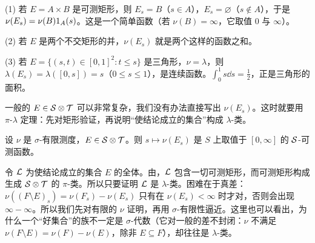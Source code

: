 \begin{example}[截口测度是什么样的函数]\label{ex:product:section-function}
(1) 若 $E=A\times B$ 是可测矩形，则 $E_s=B$（$s\in A$），$E_s=\varnothing$（$s\notin A$），于是 $\nu(E_s)=\nu(B)1_A(s)$。这是一个简单函数（若 $\nu(B)=\infty$，它取值 $0$ 与 $\infty$）。

(2) 若 $E$ 是两个不交矩形的并，$\nu(E_s)$ 就是两个这样的函数之和。

(3) 若 $E=\{(s,t)\in[0,1]^2:t\leqslant s\}$ 是三角形，$\nu=\lambda$，则 $\lambda(E_s)=\lambda([0,s])=s$（$0\leqslant s\leqslant1$），是连续函数。$\int_0^1s\dd s=\frac12$，正是三角形的面积。

一般的 $E\in\mathcal{S}\otimes\mathcal{T}$ 可以非常复杂，我们没有办法直接写出 $\nu(E_s)$。这时就要用 $\pi$-$\lambda$ 定理：先对矩形验证，再说明“使结论成立的集合”构成 $\lambda$-类。
\end{example}

\begin{lemma}\label{lem:product:section-measurable}
设 $\nu$ 是 $\sigma$-有限测度，$E\in\mathcal{S}\otimes\mathcal{T}$。则 $s\mapsto\nu(E_s)$ 是 $S$ 上取值于 $[0,\infty]$ 的 $\mathcal{S}$-可测函数。
\end{lemma}

\begin{remark}[证明思路]
令 $\mathcal{L}$ 为使结论成立的集合 $E$ 的全体。由，$\mathcal{L}$ 包含一切可测矩形，而可测矩形构成生成 $\mathcal{S}\otimes\mathcal{T}$ 的 $\pi$-类。所以只要证明 $\mathcal{L}$ 是 $\lambda$-类。困难在于真差：$\nu((F\setminus E)_s)=\nu(F_s)-\nu(E_s)$ 只有在 $\nu(E_s)<\infty$ 时才对，否则会出现 $\infty-\infty$。所以我们先对有限的 $\nu$ 证明，再用 $\sigma$-有限性逼近。这里也可以看出，为什么一个“好集合”的族不一定是 $\sigma$-代数（它对一般的差不封闭：$\nu$ 不满足 $\nu(F\setminus E)=\nu(F)-\nu(E)$，除非 $E\subseteq F$），却往往是 $\lambda$-类。
\end{remark}

